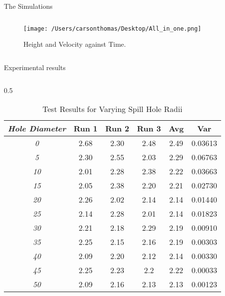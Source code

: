 \documentclass[final]{beamer}
\newlength{\colwidth}
\begin{document}
\begin{frame}[t]
\begin{columns}[t]
\begin{column}{\colwidth}
\begin{block}{The Simulations}
\begin{columns}
    \begin{column}{0.5\textwidth}  %
        \begin{figure}
            \centering
            \texttt{[image: /Users/carsonthomas/Desktop/All\_in\_one.png]} %
            \caption{Height and Velocity against Time.}
            \label{fig:example}
        \end{figure}
    \end{column}

\end{columns}

\end{block}


  \begin{block}{Experimental results}
\begin{columns}[t]
\hspace{20pt} %
\begin{column}{0.5\colwidth}
\begin{table}[h!]
    \centering
    \begin{tabular}{>{\itshape}c c c c c c}
        \toprule
        Hole Diameter & Run 1 & Run 2 & Run 3 & Avg & Var \\
        \midrule
        0  & 2.68 & 2.30 & 2.48 & 2.49 & 0.03613 \\
        5  & 2.30 & 2.55 & 2.03 & 2.29 & 0.06763 \\
        10 & 2.01 & 2.28 & 2.38 & 2.22 & 0.03663 \\
        15 & 2.05 & 2.38 & 2.20 & 2.21 & 0.02730 \\
        20 & 2.26 & 2.02 & 2.14 & 2.14 & 0.01440 \\
        25 & 2.14 & 2.28 & 2.01 & 2.14 & 0.01823 \\
        30 & 2.21 & 2.18 & 2.29 & 2.19 & 0.00910 \\
        35 & 2.25 & 2.15 & 2.16 & 2.19 & 0.00303 \\
        40 & 2.09 & 2.20 & 2.12 & 2.14 & 0.00330 \\
        45 & 2.25 & 2.23 & 2.2  & 2.22 & 0.00033 \\
        50 & 2.09 & 2.16 & 2.13 & 2.13 & 0.00123 \\
        \bottomrule
    \end{tabular}
    \caption{Test Results for Varying Spill Hole Radii}
    \label{tab:test_results_variance}
\end{table}


\end{column}
\end{columns}
\end{block}
\end{column}
\end{columns}
\end{frame}
\end{document}
